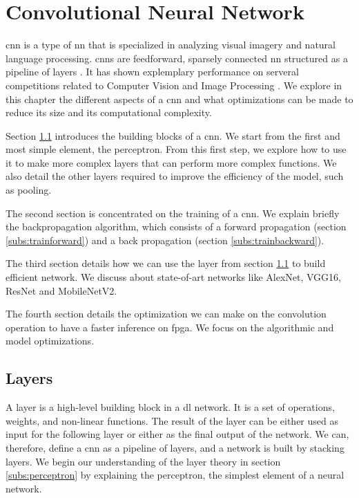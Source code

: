 \chapter{Convolutional Neural Network} \label{chap:cnn}
\acrfull{cnn} is a type of \acrlong{nn} that is specialized in analyzing visual imagery and natural language processing. \acrshort{cnn}s are feedforward, sparsely connected \acrshort{nn} structured as a pipeline of layers \cite{abdelouahab_accelerating_2018}. It has shown explemplary performance on serveral competitions related to Computer Vision and Image Processing \cite{khan_survey_2020}. We explore in this chapter the different aspects of a \acrshort{cnn} and what optimizations can be made to reduce its size and its computational complexity.

Section \ref{sec:layer} introduces the building blocks of a \acrshort{cnn}. We start from the first and most simple element, the perceptron. From this first step, we explore how to use it to make more complex layers that can perform more complex functions. We also detail the other layers required to improve the efficiency of the model, such as pooling.

The second section is concentrated on the training of a \acrshort{cnn}. We explain briefly the backpropagation algorithm, which consists of a forward propagation (section \ref{subs:trainforward}) and a back propagation (section \ref{subs:trainbackward}).

The third section details how we can use the layer from section \ref{sec:layer} to build efficient network. We discuss about state-of-art networks like AlexNet, VGG16, ResNet and MobileNetV2.

The fourth section details the optimization we can make on the convolution operation to have a faster inference on \acrshort{fpga}. We focus on the algorithmic and model optimizations.
%
%
\section{Layers} \label{sec:layer}
A layer is a high-level building block in a \acrshort{dl} network. It is a set of operations, weights, and non-linear functions. The result of the layer can be either used as input for the following layer or either as the final output of the network. We can, therefore, define a \acrshort{cnn} as a pipeline of layers, and a network is built by stacking layers. We begin our understanding of the layer theory in section \ref{subs:perceptron} by explaining the perceptron, the simplest element of a neural network.
%
%

%

%

%

%

%

%
%

